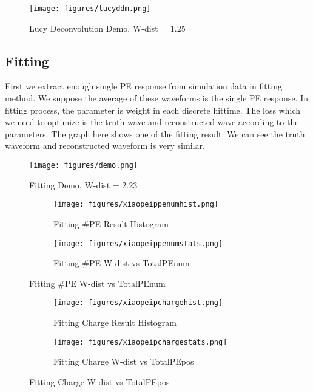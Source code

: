 \begin{figure}[H]
    \centering
    \texttt{[image: figures/lucyddm.png]}
    \caption{Lucy Deconvolution Demo, W-dist = 1.25}
\end{figure}

\subsection{Fitting}
First we extract enough single PE response from simulation data in fitting method. We suppose the average of these waveforms is the single PE response. In fitting process, the parameter is weight in each discrete hittime. The loss which we need to optimize is the truth wave and reconstructed wave according to the parameters. The graph here shows one of the fitting result. We can see the truth waveform and reconstructed waveform is very similar. 

\begin{figure}
    \centering
    \texttt{[image: figures/demo.png]}
    \caption{Fitting Demo, W-dist = 2.23}
\end{figure}

\begin{figure}[H]
\begin{minipage}{.5\textwidth}
\begin{figure}[H]
    \centering
        \texttt{[image: figures/xiaopeippenumhist.png]}
    \caption{Fitting \#PE Result Histogram}
\end{figure}
\end{minipage}
\begin{minipage}{.5\textwidth}
\begin{figure}[H]
    \centering
        \texttt{[image: figures/xiaopeippenumstats.png]}
    \caption{Fitting \#PE W-dist vs TotalPEnum}
\end{figure}
\end{minipage}
\end{figure}
\begin{figure}[H]
\begin{minipage}{.5\textwidth}
\begin{figure}[H]
    \centering
        \texttt{[image: figures/xiaopeipchargehist.png]}
    \caption{Fitting Charge Result Histogram}
\end{figure}
\end{minipage}
\begin{minipage}{.5\textwidth}
\begin{figure}[H]
    \centering
        \texttt{[image: figures/xiaopeipchargestats.png]}
    \caption{Fitting Charge W-dist vs TotalPEpos}
\end{figure}
\end{minipage}
\end{figure}

